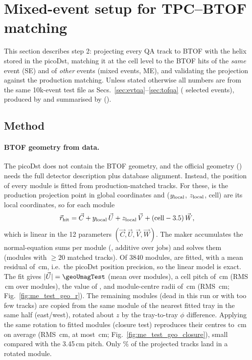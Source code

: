 \section{Mixed-event setup for TPC--BTOF matching}
\label{sec:me}

This section describes step 2: projecting every QA track to BTOF with the helix stored in the picoDst,
matching it at the cell level to the BTOF hits of the \emph{same} event (SE) and of \emph{other} events
(mixed events, ME), and validating the projection against the production matching.
Unless stated otherwise all numbers are from the same 10k-event test file as Secs.~\ref{sec:evtqa}--\ref{sec:tofqa}
(\meEvtSelTest{} selected events), produced by  and summarised by
 ().

\subsection{Method}
\paragraph{BTOF geometry from data.} The picoDst does not contain the BTOF geometry, and the
official geometry () needs the full detector description plus database
alignment. Instead, the position of every module is fitted from production-matched tracks.
For these,  is the production projection point in global coordinates and
($y_{\rm local}$, $z_{\rm local}$, cell) are its local coordinates, so for each module
\begin{equation}
\vec r_{\rm hit} = \vec C + y_{\rm local}\,\vec U + z_{\rm local}\,\vec V + (\mathrm{cell}-3.5)\,\vec W ,
\end{equation}
which is linear in the 12 parameters $(\vec C,\vec U,\vec V,\vec W)$. The maker accumulates the
normal-equation sums per module (, additive over jobs) and
 solves them (modules with $\ge20$ matched tracks).
Of 3840 modules, \geoNFitTest{} are fitted, with a mean residual of \geoFitRmsTest\,cm, i.e.\ the
picoDst position precision, so the linear model is exact. The fit gives $|\vec U|=\geoUmagTest$ (mean over modules), a cell pitch of
\geoPitchAbsTest\,cm (RMS \geoPitchRmsTest\,cm over modules), the  value of
, and module-centre radii of \geoRMeanTest\,cm (RMS \geoRRmsTest\,cm;
Fig.~\ref{fig:me_test_geo_r}). The remaining \geoNRotTest{} modules (dead in this run or with too few tracks) are
copied from the same module of the nearest fitted tray in the same half (east/west), rotated about $z$
by the tray-to-tray $\phi$ difference. Applying the same rotation to fitted modules (closure test) reproduces
their centres to \geoClosureMeanTest\,cm on average (RMS \geoClosureRmsTest\,cm, at most
\geoClosureMaxTest\,cm; Fig.~\ref{fig:me_test_geo_closure}), small compared with the 3.45\,cm pitch.
Only \meFracRotGeomTest\% of the projected tracks land in a rotated module.

